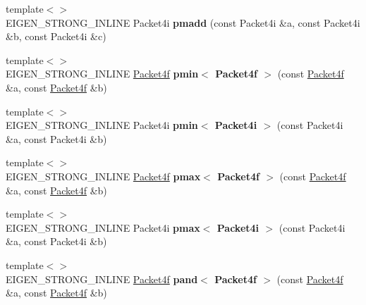 \begin{DoxyCompactItemize}
\item 
\mbox{\label{namespace_eigen_1_1internal_a42d9d7327cce6bb6f38b1f11df8d2289}} 
{\footnotesize template$<$$>$ }\\E\+I\+G\+E\+N\+\_\+\+S\+T\+R\+O\+N\+G\+\_\+\+I\+N\+L\+I\+NE Packet4i {\bfseries pmadd} (const Packet4i \&a, const Packet4i \&b, const Packet4i \&c)
\item 
\mbox{\label{namespace_eigen_1_1internal_a1247c9b2be448c969a8072b27d544355}} 
{\footnotesize template$<$$>$ }\\E\+I\+G\+E\+N\+\_\+\+S\+T\+R\+O\+N\+G\+\_\+\+I\+N\+L\+I\+NE \hyperlink{struct_eigen_1_1internal_1_1_packet4f}{Packet4f} {\bfseries pmin$<$ Packet4f $>$} (const \hyperlink{struct_eigen_1_1internal_1_1_packet4f}{Packet4f} \&a, const \hyperlink{struct_eigen_1_1internal_1_1_packet4f}{Packet4f} \&b)
\item 
\mbox{\label{namespace_eigen_1_1internal_ab0fc91b2aa448d8ca108aeb812a4c444}} 
{\footnotesize template$<$$>$ }\\E\+I\+G\+E\+N\+\_\+\+S\+T\+R\+O\+N\+G\+\_\+\+I\+N\+L\+I\+NE Packet4i {\bfseries pmin$<$ Packet4i $>$} (const Packet4i \&a, const Packet4i \&b)
\item 
\mbox{\label{namespace_eigen_1_1internal_afed49610891a1b453cf0ebf8f4fec3ce}} 
{\footnotesize template$<$$>$ }\\E\+I\+G\+E\+N\+\_\+\+S\+T\+R\+O\+N\+G\+\_\+\+I\+N\+L\+I\+NE \hyperlink{struct_eigen_1_1internal_1_1_packet4f}{Packet4f} {\bfseries pmax$<$ Packet4f $>$} (const \hyperlink{struct_eigen_1_1internal_1_1_packet4f}{Packet4f} \&a, const \hyperlink{struct_eigen_1_1internal_1_1_packet4f}{Packet4f} \&b)
\item 
\mbox{\label{namespace_eigen_1_1internal_ad9f57ee724ff8d0c74957beb4ad40d8e}} 
{\footnotesize template$<$$>$ }\\E\+I\+G\+E\+N\+\_\+\+S\+T\+R\+O\+N\+G\+\_\+\+I\+N\+L\+I\+NE Packet4i {\bfseries pmax$<$ Packet4i $>$} (const Packet4i \&a, const Packet4i \&b)
\item 
\mbox{\label{namespace_eigen_1_1internal_acf375c264eb0355dc0a93084b32a2b0b}} 
{\footnotesize template$<$$>$ }\\E\+I\+G\+E\+N\+\_\+\+S\+T\+R\+O\+N\+G\+\_\+\+I\+N\+L\+I\+NE \hyperlink{struct_eigen_1_1internal_1_1_packet4f}{Packet4f} {\bfseries pand$<$ Packet4f $>$} (const \hyperlink{struct_eigen_1_1internal_1_1_packet4f}{Packet4f} \&a, const \hyperlink{struct_eigen_1_1internal_1_1_packet4f}{Packet4f} \&b)

\end{DoxyCompactItemize}

